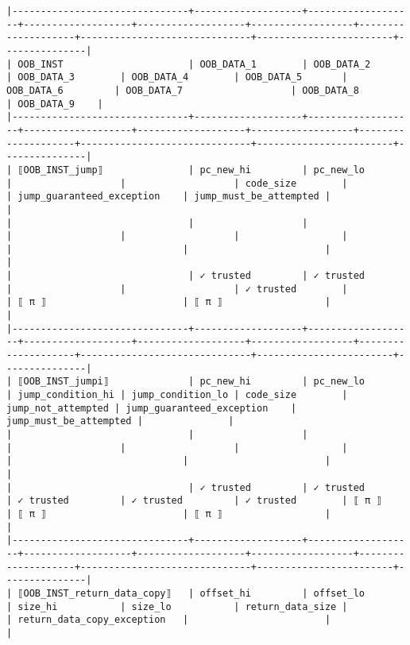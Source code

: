 \documentclass[varwidth=\maxdimen,margin=0.5cm,multi={verbatim}]{standalone}
\begin{document}
\begin{verbatim}
|-------------------------------+-------------------+-------------------+-------------------+-------------------+------------------+--------------------+------------------------------+------------------------+---------------|
| OOB_INST                      | OOB_DATA_1        | OOB_DATA_2        | OOB_DATA_3        | OOB_DATA_4        | OOB_DATA_5       | OOB_DATA_6         | OOB_DATA_7                   | OOB_DATA_8             | OOB_DATA_9    |
|-------------------------------+-------------------+-------------------+-------------------+-------------------+------------------+--------------------+------------------------------+------------------------+---------------|
| ⟦OOB_INST_jump⟧               | pc_new_hi         | pc_new_lo         |                   |                   | code_size        |                    | jump_guaranteed_exception    | jump_must_be_attempted |               |
|                               |                   |                   |                   |                   |                  |                    |                              |                        |               |
|                               | ✓ trusted         | ✓ trusted         |                   |                   | ✓ trusted        |                    | ⟦ π ⟧                        | ⟦ π ⟧                  |               |
|-------------------------------+-------------------+-------------------+-------------------+-------------------+------------------+--------------------+------------------------------+------------------------+---------------|
| ⟦OOB_INST_jumpi⟧              | pc_new_hi         | pc_new_lo         | jump_condition_hi | jump_condition_lo | code_size        | jump_not_attempted | jump_guaranteed_exception    | jump_must_be_attempted |               |
|                               |                   |                   |                   |                   |                  |                    |                              |                        |               |
|                               | ✓ trusted         | ✓ trusted         | ✓ trusted         | ✓ trusted         | ✓ trusted        | ⟦ π ⟧              | ⟦ π ⟧                        | ⟦ π ⟧                  |               |
|-------------------------------+-------------------+-------------------+-------------------+-------------------+------------------+--------------------+------------------------------+------------------------+---------------|
| ⟦OOB_INST_return_data_copy⟧   | offset_hi         | offset_lo         | size_hi           | size_lo           | return_data_size |                    | return_data_copy_exception   |                        |               |

\end{verbatim}
\end{document}
